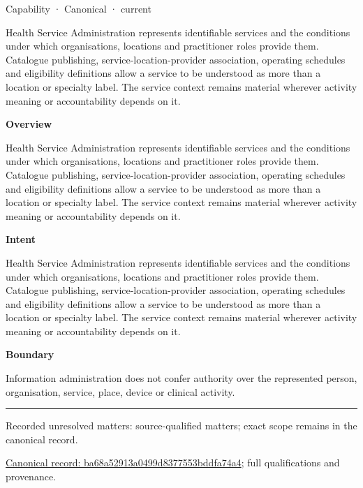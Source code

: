 \label{element:ba68a52913a0499d8377553bddfa74a4}
{\small Capability · Canonical · current}\par

Health Service Administration represents identifiable services and the conditions under which organisations, locations and practitioner roles provide them. Catalogue publishing, service-location-provider association, operating schedules and eligibility definitions allow a service to be understood as more than a location or specialty label. The service context remains material wherever activity meaning or accountability depends on it.



\textbf{Overview}



Health Service Administration represents identifiable services and the conditions under which organisations, locations and practitioner roles provide them. Catalogue publishing, service-location-provider association, operating schedules and eligibility definitions allow a service to be understood as more than a location or specialty label. The service context remains material wherever activity meaning or accountability depends on it.



\textbf{Intent}



Health Service Administration represents identifiable services and the conditions under which organisations, locations and practitioner roles provide them. Catalogue publishing, service-location-provider association, operating schedules and eligibility definitions allow a service to be understood as more than a location or specialty label. The service context remains material wherever activity meaning or accountability depends on it.



\textbf{Boundary}



Information administration does not confer authority over the represented person, organisation, service, place, device or clinical activity.



\medskip\hrule\medskip

{\small Recorded unresolved matters: source-qualified matters; exact scope remains in the canonical record.}\par
{\footnotesize \href{../../../../continuum/strategy/capability/ba68a52913a0499d8377553bddfa74a4.md}{Canonical record: ba68a52913a0499d8377553bddfa74a4}; full qualifications and provenance.}\par
